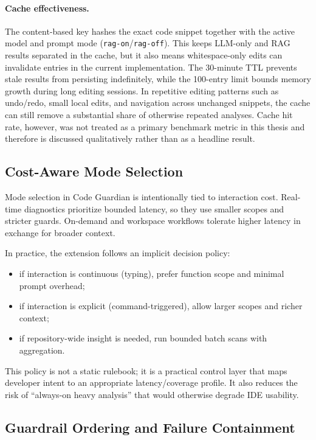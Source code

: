 \paragraph{Cache effectiveness.}
The content-based key hashes the exact code snippet together with the active model and prompt mode (\texttt{rag-on}/\texttt{rag-off}). This keeps LLM-only and RAG results separated in the cache, but it also means whitespace-only edits can invalidate entries in the current implementation. The 30-minute TTL prevents stale results from persisting indefinitely, while the 100-entry limit bounds memory growth during long editing sessions. In repetitive editing patterns such as undo/redo, small local edits, and navigation across unchanged snippets, the cache can still remove a substantial share of otherwise repeated analyses. Cache hit rate, however, was not treated as a primary benchmark metric in this thesis and therefore is discussed qualitatively rather than as a headline result.

\subsection{Cost-Aware Mode Selection}
\label{subsec:impl-cost-aware-selection}

Mode selection in Code Guardian is intentionally tied to interaction cost. Real-time diagnostics prioritize bounded latency, so they use smaller scopes and stricter guards. On-demand and workspace workflows tolerate higher latency in exchange for broader context.

In practice, the extension follows an implicit decision policy:
\begin{itemize}
  \item if interaction is continuous (typing), prefer function scope and minimal prompt overhead;
  \item if interaction is explicit (command-triggered), allow larger scopes and richer context;
  \item if repository-wide insight is needed, run bounded batch scans with aggregation.
\end{itemize}

This policy is not a static rulebook; it is a practical control layer that maps developer intent to an appropriate latency/coverage profile. It also reduces the risk of ``always-on heavy analysis'' that would otherwise degrade IDE usability.

\subsection{Guardrail Ordering and Failure Containment}
\label{subsec:impl-guardrail-order}

